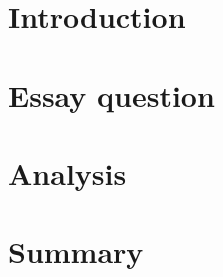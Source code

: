 \documentclass{article}
\begin{document}


\section{Introduction}
    

\section{Essay question}
    

\section{Analysis}
    

\section{Summary}
    

\nocite{*}
\printbibliography{}
\end{document}
